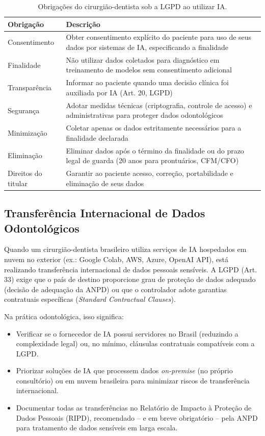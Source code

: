 \begin{table}[H]
  \centering
  \caption{Obrigações do cirurgião-dentista sob a LGPD ao utilizar IA.}
  \label{tab:lgpd-ia-consultorio}
  \begin{tabularx}{\textwidth}{lX}
    \toprule
    \textbf{Obrigação} & \textbf{Descrição} \\
    \midrule
    Consentimento & Obter consentimento explícito do paciente para uso de
      seus dados por sistemas de IA, especificando a finalidade \\
    Finalidade & Não utilizar dados coletados para diagnóstico em treinamento
      de modelos sem consentimento adicional \\
    Transparência & Informar ao paciente quando uma decisão clínica foi
      auxiliada por IA (Art. 20, LGPD) \\
    Segurança & Adotar medidas técnicas (criptografia, controle de acesso) e
      administrativas para proteger dados odontológicos \\
    Minimização & Coletar apenas os dados estritamente necessários para a
      finalidade declarada \\
    Eliminação & Eliminar dados após o término da finalidade ou do prazo
      legal de guarda (20 anos para prontuários, CFM/CFO) \\
    Direitos do titular & Garantir ao paciente acesso, correção,
      portabilidade e eliminação de seus dados \\
    \bottomrule
  \end{tabularx}
\end{table}

\subsection{Transferência Internacional de Dados Odontológicos}

Quando um cirurgião-dentista brasileiro utiliza serviços de IA hospedados em
nuvem no exterior (ex.: Google Colab, AWS, Azure, OpenAI API), está realizando
transferência internacional de dados pessoais sensíveis. A LGPD (Art. 33) exige
que o país de destino proporcione grau de proteção de dados adequado (decisão
de adequação da ANPD) ou que o controlador adote garantias contratuais
específicas (\textit{Standard Contractual Clauses}).

Na prática odontológica, isso significa:

\begin{itemize}
  \item Verificar se o fornecedor de IA possui servidores no Brasil (reduzindo
    a complexidade legal) ou, no mínimo, cláusulas contratuais compatíveis com
    a LGPD.
  \item Priorizar soluções de IA que processem dados \textit{on-premise} (no
    próprio consultório) ou em nuvem brasileira para minimizar riscos de
    transferência internacional.
  \item Documentar todas as transferências no Relatório de Impacto à Proteção
    de Dados Pessoais (RIPD), recomendado -- e em breve obrigatório -- pela
    ANPD para tratamento de dados sensíveis em larga escala.
\end{itemize}

